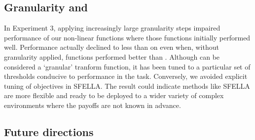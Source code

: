 







\subsection{Granularity and \tloA{}}

In Experiment 3, applying increasingly large granularity steps impaired performance of our non-linear functions where those functions initially performed well. Performance actually declined to less than \tloA{} on even when, without granularity applied, functions performed better than \tloA{}. Although \tloA{} can be considered a `granular' tranform function, it has been tuned to a particular set of thresholds conducive to performance in the task. Conversely, we avoided explicit tuning of objectives in SFELLA. The result could indicate methods like SFELLA are more flexible and ready to be deployed to a wider variety of complex environments where the payoffs are not known in advance.

\subsection{Future directions}

